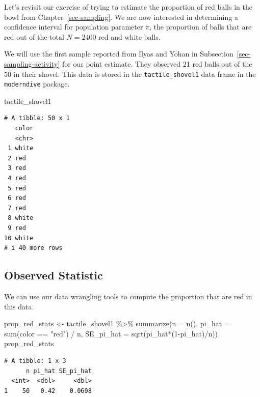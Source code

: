 \documentclass[
  letterpaper,
  DIV=11,
  numbers=noendperiod]{scrreprt}
\newenvironment{Shaded}{\begin{snugshade}}{\end{snugshade}}
\newcommand{\AttributeTok}[1]{\textcolor[rgb]{0.40,0.45,0.13}{#1}}
\newcommand{\DecValTok}[1]{\textcolor[rgb]{0.68,0.00,0.00}{#1}}
\newcommand{\FunctionTok}[1]{\textcolor[rgb]{0.28,0.35,0.67}{#1}}
\newcommand{\NormalTok}[1]{\textcolor[rgb]{0.00,0.23,0.31}{#1}}
\newcommand{\OtherTok}[1]{\textcolor[rgb]{0.00,0.23,0.31}{#1}}
\newcommand{\SpecialCharTok}[1]{\textcolor[rgb]{0.37,0.37,0.37}{#1}}
\newcommand{\StringTok}[1]{\textcolor[rgb]{0.13,0.47,0.30}{#1}}
\theoremstyle{definition}
\theoremstyle{remark}
\begin{document}
Let's revisit our exercise of trying to estimate the proportion of red
balls in the bowl from Chapter~\ref{sec-sampling}. We are now interested
in determining a confidence interval for population parameter \(\pi\),
the proportion of balls that are red out of the total \(N = 2400\) red
and white balls.

We will use the first sample reported from Ilyas and Yohan in
Subsection~\ref{sec-sampling-activity} for our point estimate. They
observed 21 red balls out of the 50 in their shovel. This data is stored
in the \texttt{tactile\_shovel1} data frame in the \texttt{moderndive}
package.

\begin{Shaded}
\begin{Highlighting}[]
\NormalTok{tactile\_shovel1}
\end{Highlighting}
\end{Shaded}

\begin{verbatim}
# A tibble: 50 x 1
   color
   <chr>
 1 white
 2 red  
 3 red  
 4 red  
 5 red  
 6 red  
 7 red  
 8 white
 9 red  
10 white
# i 40 more rows
\end{verbatim}

\hypertarget{observed-statistic}{%
\subsection{Observed Statistic}\label{observed-statistic}}

We can use our data wrangling tools to compute the proportion that are
red in this data.

\begin{Shaded}
\begin{Highlighting}[]
\NormalTok{prop\_red\_stats }\OtherTok{\textless{}{-}}\NormalTok{ tactile\_shovel1 }\SpecialCharTok{\%\textgreater{}\%} 
  \FunctionTok{summarize}\NormalTok{(}\AttributeTok{n =} \FunctionTok{n}\NormalTok{(),}
            \AttributeTok{pi\_hat =} \FunctionTok{sum}\NormalTok{(color }\SpecialCharTok{==} \StringTok{"red"}\NormalTok{) }\SpecialCharTok{/}\NormalTok{ n,}
            \AttributeTok{SE\_pi\_hat =} \FunctionTok{sqrt}\NormalTok{(pi\_hat}\SpecialCharTok{*}\NormalTok{(}\DecValTok{1}\SpecialCharTok{{-}}\NormalTok{pi\_hat)}\SpecialCharTok{/}\NormalTok{n))}
\NormalTok{prop\_red\_stats}
\end{Highlighting}
\end{Shaded}

\begin{verbatim}
# A tibble: 1 x 3
      n pi_hat SE_pi_hat
  <int>  <dbl>     <dbl>
1    50   0.42    0.0698
\end{verbatim}
\end{document}
